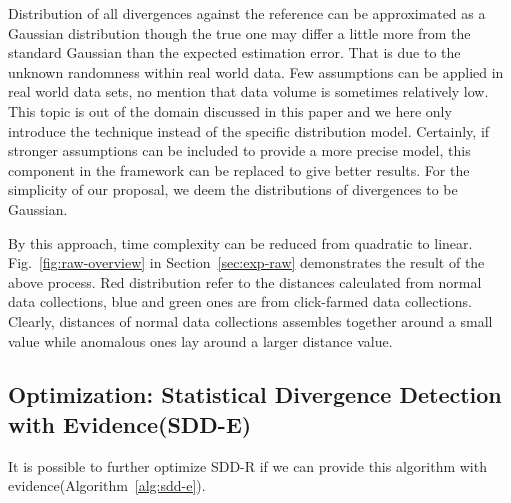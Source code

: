 \documentclass{article}
\begin{document}
			Distribution of all divergences against the reference can be approximated as a Gaussian distribution though the true one may differ a little more from the standard Gaussian than the expected estimation error. That is due to the unknown randomness within real world data. Few assumptions can be applied in real world data sets, no mention that data volume is sometimes relatively low. This topic is out of the domain discussed in this paper and we here only introduce the technique instead of the specific distribution model. 
			Certainly, if stronger assumptions can be included to provide a more precise model, this component in the framework can be replaced to give better results.
			For the simplicity of our proposal, we deem the distributions of divergences to be Gaussian.
			
			By this approach, time complexity can be reduced from quadratic to linear. Fig.~\ref{fig:raw-overview} in Section~\ref{sec:exp-raw} demonstrates the result of the above process. Red distribution refer to the distances calculated from normal data collections, blue and green ones are from click-farmed data collections. Clearly, distances of normal data collections assembles together around a small value while anomalous ones lay around a larger distance value.
	
		\subsection{Optimization: Statistical Divergence Detection with Evidence(SDD-E)}
			It is possible to further optimize SDD-R if we can provide this algorithm with evidence(Algorithm~\ref{alg:sdd-e}).
	
\end{document}

